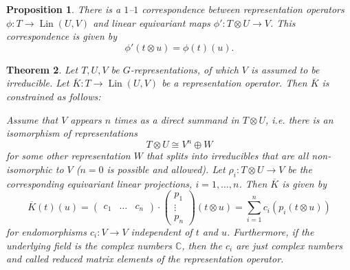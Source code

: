 \documentclass[12pt, a4paper]{article}
\theoremstyle{plain}
\newtheorem{pro}{Proposition}[section]
\newtheorem{thm}[pro]{Theorem}
\theoremstyle{definition}
\theoremstyle{remark}
\newcommand{\C}{\mathds{C}}
\DeclareMathOperator{\lin}{Lin}
\begin{document}
\begin{pro}\label{correspondence}
There is a $1$–$1$ correspondence between representation operators $\phi: T \to \lin(U,V)$ and linear equivariant maps $\phi': T \otimes U \to V$. This correspondence is given by
\begin{equation*}
\phi'(t \otimes u) = \phi(t)(u).
\end{equation*}
\end{pro}

\begin{thm}\label{theorem}
Let $T, U, V$ be $G$-representations, of which $V$ is assumed to be irreducible. Let $\overline{K}: T \to \lin(U, V)$ be a representation operator. Then $\overline{K}$ is constrained as follows:

Assume that $V$ appears $n$ times as a direct summand in $T \otimes U$, i.e. there is an isomorphism of representations
\begin{equation*}
T \otimes U \cong V^n \oplus W
\end{equation*}
for some other representation $W$ that splits into irreducibles that are all non-isomorphic to $V$ ($n = 0$ is possible and allowed). Let $\rho_i: T \otimes U \to V$ be the corresponding equivariant linear projections, $i = 1, \dots, n$. Then $\overline{K}$ is given by
\begin{equation*}
\overline{K}(t)(u) = \begin{pmatrix}c_1 & \hdots & c_n \end{pmatrix} \cdot \begin{pmatrix} p_1 \\ \vdots \\ p_n \end{pmatrix} (t \otimes u)= \sum_{i = 1}^{n}c_i \left( p_i(t \otimes u) \right)
\end{equation*}
for endomorphisms $c_i: V \to V$ independent of $t$ and $u$. Furthermore, if the underlying field is the complex numbers $\C$, then the $c_i$ are just complex numbers and called reduced matrix elements of the representation operator. 
\end{thm}
\end{document}

